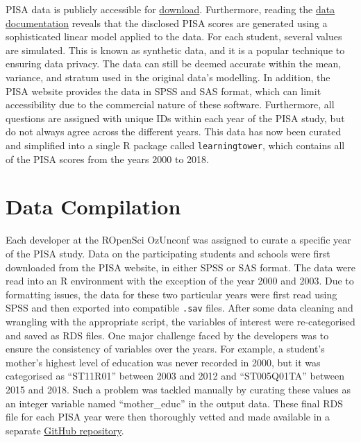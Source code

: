 PISA data is publicly accessible for
\href{https://www.oecd.org/pisa/data/}{download}. Furthermore, reading
the
\href{https://www.oecd.org/pisa/data/pisa2018technicalreport/Ch.09-Scaling-PISA-Data.pdf}{data
documentation} reveals that the disclosed PISA scores are generated
using a sophisticated linear model applied to the data. For each
student, several values are simulated. This is known as synthetic data,
and it is a popular technique to ensuring data privacy. The data can
still be deemed accurate within the mean, variance, and stratum used in
the original data's modelling. In addition, the PISA website provides
the data in SPSS and SAS format, which can limit accessibility due to
the commercial nature of these software. Furthermore, all questions are
assigned with unique IDs within each year of the PISA study, but do not
always agree across the different years. This data has now been curated
and simplified into a single R package called \texttt{learningtower},
which contains all of the PISA scores from the years 2000 to 2018.

\hypertarget{data-compilation}{%
\section{Data Compilation}\label{data-compilation}}

Each developer at the ROpenSci OzUnconf was assigned to curate a
specific year of the PISA study. Data on the participating students and
schools were first downloaded from the PISA website, in either SPSS or
SAS format. The data were read into an R environment with the exception
of the year 2000 and 2003. Due to formatting issues, the data for these
two particular years were first read using SPSS and then exported into
compatible \texttt{.sav} files. After some data cleaning and wrangling
with the appropriate script, the variables of interest were
re-categorised and saved as RDS files. One major challenge faced by the
developers was to ensure the consistency of variables over the years.
For example, a student's mother's highest level of education was never
recorded in 2000, but it was categorised as ``ST11R01'' between 2003 and
2012 and ``ST005Q01TA'' between 2015 and 2018. Such a problem was
tackled manually by curating these values as an integer variable named
``mother\_educ'' in the output data. These final RDS file for each PISA
year were then thoroughly vetted and made available in a separate
\href{https://github.com/kevinwang09/learningtower_masonry}{GitHub
repository}.

